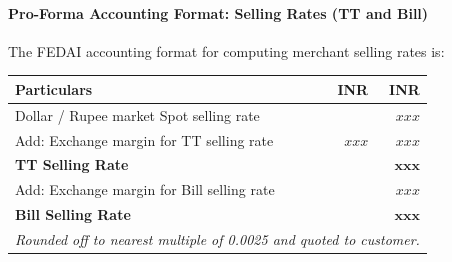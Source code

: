 \paragraph{Pro-Forma Accounting Format: Selling Rates (TT and Bill)}
The FEDAI accounting format for computing merchant selling rates is:

\begin{center}
\small
\begin{tabularx}{0.88\linewidth}{Xrr}
\toprule
\textbf{Particulars} & \textbf{INR} & \textbf{INR} \\
\midrule
Dollar / Rupee market Spot selling rate & & $xxx$ \\
Add: Exchange margin for TT selling rate & $xxx$ & $xxx$ \\
\midrule
\textbf{TT Selling Rate} & & $\mathbf{xxx}$ \\
Add: Exchange margin for Bill selling rate & & $xxx$ \\
\midrule
\textbf{Bill Selling Rate} & & $\mathbf{xxx}$ \\
\bottomrule
\multicolumn{3}{l}{\footnotesize\textit{Rounded off to nearest multiple of 0.0025 and quoted to customer.}}
\end{tabularx}
\end{center}

